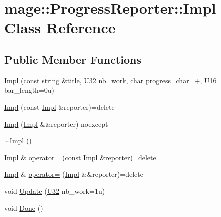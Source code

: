 \hypertarget{classmage_1_1_progress_reporter_1_1_impl}{}\section{mage\+:\+:Progress\+Reporter\+:\+:Impl Class Reference}
\label{classmage_1_1_progress_reporter_1_1_impl}
\subsection*{Public Member Functions}
\begin{DoxyCompactItemize}
\item 
\hyperlink{classmage_1_1_progress_reporter_1_1_impl_adbc7eea5ecbc0733967aa186b61a1582}{Impl} (const string \&title, \hyperlink{namespacemage_a41c104c036fba3756a74e19f793eeaa1}{U32} nb\+\_\+work, char progress\+\_\+char=\textquotesingle{}+\textquotesingle{}, \hyperlink{namespacemage_af69057eec1ce005c1c3b34ae33486f16}{U16} bar\+\_\+length=0u)
\item 
\hyperlink{classmage_1_1_progress_reporter_1_1_impl_af721b271934a492c3a47d8920d76c3c8}{Impl} (const \hyperlink{classmage_1_1_progress_reporter_1_1_impl}{Impl} \&reporter)=delete
\item 
\hyperlink{classmage_1_1_progress_reporter_1_1_impl_ab3b6811ed80a087ac10c90e97730147c}{Impl} (\hyperlink{classmage_1_1_progress_reporter_1_1_impl}{Impl} \&\&reporter) noexcept
\item 
\hyperlink{classmage_1_1_progress_reporter_1_1_impl_af5dbbaa059fdfc22e90e274ba14053a8}{$\sim$\+Impl} ()
\item 
\hyperlink{classmage_1_1_progress_reporter_1_1_impl}{Impl} \& \hyperlink{classmage_1_1_progress_reporter_1_1_impl_a18d90c9b1c400d83d8c3a1ba54b23d69}{operator=} (const \hyperlink{classmage_1_1_progress_reporter_1_1_impl}{Impl} \&reporter)=delete
\item 
\hyperlink{classmage_1_1_progress_reporter_1_1_impl}{Impl} \& \hyperlink{classmage_1_1_progress_reporter_1_1_impl_a39801a31c5265467a8056f2bb125cf39}{operator=} (\hyperlink{classmage_1_1_progress_reporter_1_1_impl}{Impl} \&\&reporter)=delete
\item 
void \hyperlink{classmage_1_1_progress_reporter_1_1_impl_a89d8090c7280c12a046c03df8dc7d7b3}{Update} (\hyperlink{namespacemage_a41c104c036fba3756a74e19f793eeaa1}{U32} nb\+\_\+work=1u)
\item 
void \hyperlink{classmage_1_1_progress_reporter_1_1_impl_a58a0fb3d0e5f164fc36ad7416bb98d2d}{Done} ()
\end{DoxyCompactItemize}
